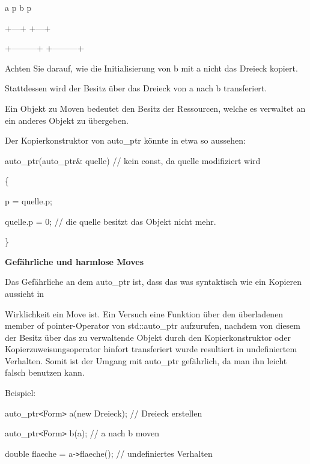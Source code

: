 \documentclass{article}
\begin{document}
a \textbar{} p \textbar{}   \textbar{} \textbar{}          b \textbar{} p \textbar{} 
\textbar{} \textbar{} \textbar{}  

\parindent=14pt
\textbar{}   +---+ \textbar{}            \textbar{}   +---+ \textbar{}  

\parindent=7pt
+---------+            +---------+

\vspace{12pt}
\parindent=0pt
Achten Sie darauf, wie die Initialisierung von b mit a nicht das Dreieck kopiert.

Stattdessen wird der Besitz über das Dreieck von a nach b transferiert.

\vspace{12pt}
Ein Objekt zu Moven bedeutet den Besitz der Ressourcen, welche es verwaltet an 
ein anderes Objekt zu übergeben.

\vspace{12pt}
Der Kopierkonstruktor von auto\_ptr könnte in etwa so aussehen:

\vspace{12pt}
auto\_ptr(auto\_ptr\& quelle) // kein const, da quelle modifiziert wird

\{    

\parindent=14pt
p = quelle.p;    

quelle.p = 0; // die quelle besitzt das Objekt nicht mehr.

\}

\vspace{12pt}
\parindent=0pt
\textbf{Gefährliche und harmlose Moves}

Das Gefährliche an dem auto\_ptr ist, dass das was syntaktisch wie ein Kopieren 
aussieht in 

Wirklichkeit ein Move ist. Ein Versuch eine Funktion über den überladenen member 
of pointer-Operator von std::auto\_ptr aufzurufen, nachdem von diesem der Besitz 
über das zu verwaltende Objekt durch den Kopierkonstruktor oder Kopierzuweisungsoperator 
hinfort transferiert wurde resultiert in undefiniertem Verhalten. Somit ist der 
Umgang mit auto\_ptr gefährlich, da man ihn leicht falsch benutzen kann.

Beispiel:

auto\_ptr\texttt{<}Form\texttt{>} a(new Dreieck); // Dreieck erstellen

auto\_ptr\texttt{<}Form\texttt{>} b(a);         // a nach b moven

double flaeche = a-\texttt{>}flaeche();  // undefiniertes Verhalten
\end{document}
